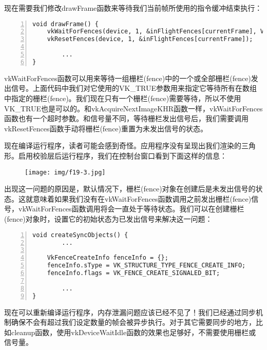 \documentclass{ctexart}
\begin{document}
现在需要我们修改drawFrame函数来等待我们当前帧所使用的指令缓冲结束执行：

\begin{lstlisting}[language={[ANSI]C},keywordstyle=\color{blue!70},commentstyle=\color{red!50!green!50!blue!50},frame=shadowbox, rulesepcolor=\color{red!20!green!20!blue!20},basicstyle=\small,numbers=left, numberstyle=\tiny,breaklines=true]
void drawFrame() {
	vkWaitForFences(device, 1, &inFlightFences[currentFrame], VK_TRUE, std::numeric_limits<uint64_t>::max());
	vkResetFences(device, 1, &inFlightFences[currentFrame]);

		...
}
\end{lstlisting}

vkWaitForFences函数可以用来等待一组栅栏(fence)中的一个或全部栅栏(fence)发出信号。上面代码中我们对它使用的VK\_TRUE参数用来指定它等待所有在数组中指定的栅栏(fence)。我们现在只有一个栅栏(fence)需要等待，所以不使用VK\_TRUE也是可以的。和vkAcquireNextImageKHR函数一样，vkWaitForFences函数也有一个超时参数。和信号量不同，等待栅栏发出信号后，我们需要调用vkResetFences函数手动将栅栏(fence)重置为未发出信号的状态。

现在编译运行程序，读者可能会感到奇怪。应用程序没有呈现出我们渲染的三角形。启用校验层后运行程序，我们在控制台窗口看到下面这样的信息：

\begin{figure}[H]
	\centering
	\texttt{[image: img/f19-3.jpg]}
\end{figure}

出现这一问题的原因是，默认情况下，栅栏(fence)对象在创建后是未发出信号的状态。这就意味着如果我们没有在vkWaitForFences函数调用之前发出栅栏(fence)信号，vkWaitForFences函数调用将会一直处于等待状态。我们可以在创建栅栏(fence)对象时，设置它的初始状态为已发出信号来解决这一问题：

\begin{lstlisting}[language={[ANSI]C},keywordstyle=\color{blue!70},commentstyle=\color{red!50!green!50!blue!50},frame=shadowbox, rulesepcolor=\color{red!20!green!20!blue!20},basicstyle=\small,numbers=left, numberstyle=\tiny,breaklines=true]
void createSyncObjects() {
		...

	VkFenceCreateInfo fenceInfo = {};
	fenceInfo.sType = VK_STRUCTURE_TYPE_FENCE_CREATE_INFO;
	fenceInfo.flags = VK_FENCE_CREATE_SIGNALED_BIT;

		...
}
\end{lstlisting}

现在可以重新编译运行程序，内存泄漏问题应该已经不见了！我们已经通过同步机制确保不会有超过我们设定数量的帧会被异步执行。对于其它需要同步的地方，比如cleanup函数，使用vkDeviceWaitIdle函数的效果也足够好，不需要使用栅栏或信号量。
\end{document}
